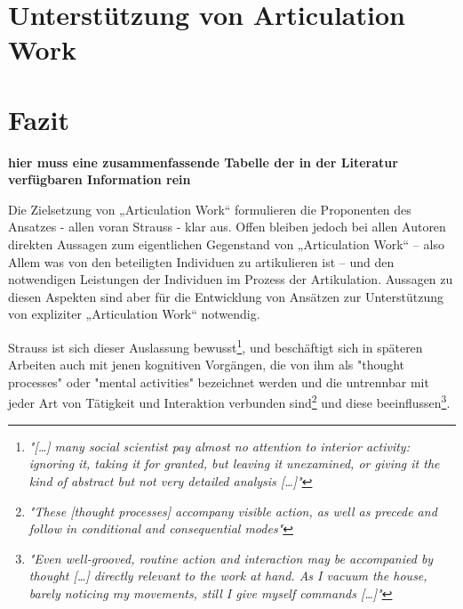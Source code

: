 \section{Unterstützung von Articulation Work} %
\label{sec:unterstützung_von_articulation_work}


\section{Fazit} %
\label{sec:fazit}

\textbf{hier muss eine zusammenfassende Tabelle der in der Literatur verfügbaren Information rein}

Die Zielsetzung von „Articulation Work“ formulieren die Proponenten des Ansatzes - allen voran Strauss - klar aus. Offen bleiben jedoch bei allen Autoren direkten Aussagen zum eigentlichen Gegenstand von „Articulation Work“ – also Allem was von den beteiligten Individuen zu artikulieren ist – und den notwendigen Leistungen der Individuen im Prozess der Artikulation. Aussagen zu diesen Aspekten sind aber für die Entwicklung von Ansätzen zur Unterstützung von expliziter „Articulation Work“ notwendig. 

Strauss ist sich dieser Auslassung bewusst\footnote{\emph{"[\ldots] many social scientist pay almost no attention to interior activity: ignoring it, taking it for granted, but leaving it unexamined, or giving it the kind of abstract but not very detailed analysis [\ldots]"}\citep[][S. 131]{Strauss93}}, und beschäftigt sich in späteren Arbeiten \citep{Strauss93} auch mit jenen kognitiven Vorgängen, die von ihm als "thought processes" oder "mental activities" bezeichnet werden und die untrennbar mit jeder Art von Tätigkeit und Interaktion verbunden sind\footnote{\emph{"These [thought processes] accompany visible action, as well as precede and follow in conditional and consequential modes"}\citep[][S. 146]{Strauss93}} und diese beeinflussen\footnote{\emph{"Even well-grooved, routine action and interaction may be accompanied by thought [\ldots] directly relevant to the work at hand. As I vacuum the house, barely noticing my movements, still I give myself commands [\ldots]"}\citep[][S. 132]{Strauss93}}. 

